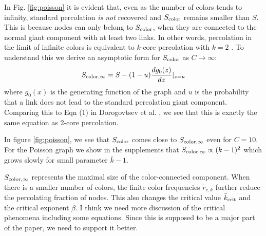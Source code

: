 \documentclass[aps, pre, twocolumn, a4paper, superscriptaddress, floatfix]{revtex4}
\newcommand{\red}{\color{red}\footnotesize}
\newcommand{\scol}{S_{\rm color}}
\begin{document}
In Fig. \ref{fig:poisson} it is evident that, even as the number of colors tends to infinity, standard percolation \textit{is not} recovered and $\scol$ remains smaller than $S$.
This is because nodes can only belong to $S_{\rm color}$, when they are connected to the normal giant component with at least two links.
In other words, percolation in the limit of infinite colors is equivalent to $k$-core percolation with $k=2$ \cite{dorogovtsev-prl2006}.
To understand this we derive an asymptotic form for $\scol$ as $C\rightarrow\infty$:
\begin{equation}
S_{{\rm color},\infty} = S - (1-u)\frac{dg_0(z)}{dz}\rvert_{z=u}
\end{equation}
where $g_0(x)$ is the generating function of the graph and $u$ is the probability that a link does not lead to the standard percolation giant component.
Comparing this to Eqn (1) in Dorogovtsev et al. \cite{dorogovtsev-prl2006}, we see that this is exactly the same equation as 2-core percolation.

In figure \ref{fig:poisson}, we see that $S_{\rm color}$ comes close to $S_{{\rm color},\infty}$ even for $C=10$.
For the Poisson graph we show in the supplements that $S_{\rm color,\infty}\propto ({\bar k}-1)^2$ 
which grows slowly for small parameter ${\bar k}-1$. 

$S_{{\rm color},\infty}$ represents the maximal size of the color-connected component.
When there is a smaller number of colors, the finite color frequencies ${\tilde r}_{c,k}$ 
further reduce the percolating fraction of nodes. 
This also changes the critical value ${\bar k}_{\rm crit}$ and the critical exponent $\beta$. 
{\red I think we need more discussion of the critical phenomena including some equations.
Since this is supposed to be a major part of the paper, we need to support it better.}
\end{document}
